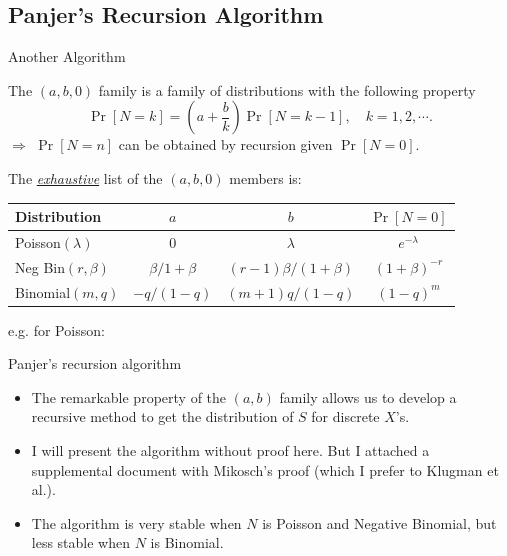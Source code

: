 \documentclass[11pt]{beamer}
\begin{document}
\subsection{Panjer's Recursion Algorithm}
\begin{frame}{Another Algorithm}

The $(a,b,0)$ family is a family of distributions with the following property
\vfill
$$\Pr[N=k]=\left(a+\frac{b}{k}\right)\Pr[N=k-1], \quad k = 1, 2, \cdots.$$
\vfill
\alert{$\Longrightarrow$} $\Pr[N=n]$ can be obtained by recursion given $\Pr[N=0]$.

\end{frame}
\begin{frame}

The \underline{\textit{exhaustive}} list of the $(a,b,0)$ members is: 


\begin{center}
\begin{tabular}{|l|c|c|c|}
\hline Distribution &  $a$ & $b$ & $\Pr[N=0]$\\ \hline
Poisson$\left( \lambda \right) $ & $0$ &  $\lambda $ & $e^{-\lambda}$ \\
Neg Bin$\left( r,\beta\right) $ & $\beta/1+\beta$ &  $(r-1)\beta/(1+\beta)$  & $(1+\beta)^{-r}$\\
Binomial$\left( m,q\right) $ & $-q/(1-q) $ & $(m+1)q/(1-q) $ & $(1-q)^m$ \\ \hline
\end{tabular}%
\end{center}

e.g. for Poisson:



\end{frame}
\begin{frame}{Panjer's recursion algorithm}

\begin{itemize}
\item The remarkable property of the $(a,b)$ family allows us to develop a recursive method to get the distribution of $S$ for discrete $X$'s.
\vfill
\item I will present the algorithm without proof here. But I attached a supplemental document with Mikosch's proof (which I prefer to Klugman et al.).
\vfill
\item The algorithm is very stable when $N$ is Poisson and Negative Binomial, but less stable when $N$ is Binomial.

\end{itemize}


\end{frame}
\end{document}
